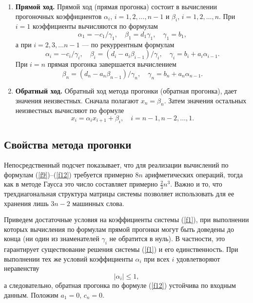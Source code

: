 \documentclass[12pt]{article}
\begin{document}
    \begin{enumerate}
        \item \textbf{Прямой ход.} Прямой ход (прямая прогонка) состоит в вычислении прогоночных коэффициентов $\alpha_i$, $i=1,2,\ldots,n-1$ и $\beta_i$, $i=1,2,\ldots, n$. При $i=1$ коэффициенты вычисляются по формулам
        \begin{equation}
            \alpha_1=-c_1/\gamma_1,\quad \beta_1=d_1\gamma_1, \quad \gamma_1=b_1,\label{f9}
        \end{equation}
        а при $i=2,3,\ldots n-1$ --- по рекуррентным формулам
        \begin{equation}
            \alpha_i=-c_i/\gamma_i,\quad \beta_i=\left(d_i-a_i\beta_{i-1}\right)/\gamma_i,\quad \gamma_i=b_i+a_i\alpha_{i-1}.
        \end{equation}
        При $i=n$ прямая прогонка завершается вычислением
        \begin{equation}
            \beta_n=\left(d_n-a_n\beta_{n-1}\right)/\gamma_n,\quad\gamma_n=b_n+a_n\alpha_{n-1}.
        \end{equation}
        \item \textbf{Обратный ход.} Обратный ход метода прогонки (обратная прогонка), дает значения неизвестных. Сначала полагают $x_n=\beta_n$. Затем значения остальных неизвестных вычисляют по формуле
        \begin{equation}
            x_i=\alpha_i x_{i+1}+\beta_i,\quad i=n-1, n-2, \ldots, 1.\label{f12}
        \end{equation}
    \end{enumerate}

    \subsection*{Свойства метода прогонки}

    Непосредственный подсчет показывает, что для реализации вычислений по формулам (\ref{f9})--(\ref{f12}) требуется примерно $8n$ арифметических операций, тогда как в методе Гаусса это число составляет примерно $\frac{2}{3}n^3$. Важно и то, что трехдиагональная структура матрицы системы позволяет использовать для ее хранения лишь $3n-2$ машинных слова.

    Приведем достаточные условия на коэффициенты системы (\ref{f1}), при выполнении которых вычисления по формулам прямой прогонки могут быть доведены до конца (ни один из знаменателей $\gamma_i$ не обратится в нуль). В частности, это гарантирует существование решения системы (\ref{f1}) и его единственность. При выполнении тех же условий коэффициенты $\alpha_i$ при всех $i$ удовлетворяют неравенству
    \begin{equation}
        \left|\alpha_i\right|\leqslant 1,
    \end{equation}
    а следовательно, обратная прогонка по формуле (\ref{f12}) устойчива по входным данным. Положим $a_1=0$, $c_n=0$.
\end{document}
